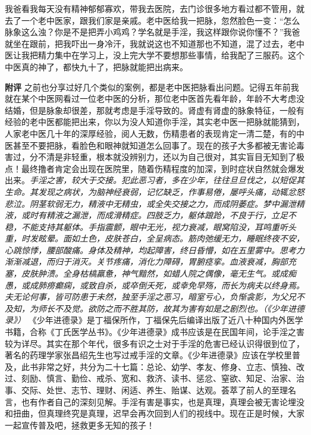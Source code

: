 \begin{case}
    我爸看我每天没有精神郁郁寡欢，带我去医院，去门诊很多地方看过都不管用，就去了一个老中医家，跟我们家是亲戚。老中医给我一把脉，忽然脸色一变：“怎么脉象这么浊？你是不是把弄小鸡鸡？学名就是手淫，我这样跟你说你懂不？”我爸就坐在跟前，把我吓出一身冷汗，我就说这也不知道那也不知道，混了过去，老中医让我把精力集中在学习上，没上完大学不要想那些事情，给我配了三服药。这个中医真的神了，都快九十了，把脉就能把出病来。

    \textbf{附评} 之前也分享过好几个类似的案例，都是老中医把脉看出问题。记得五年前我就在某个中医网看过一位老中医的分析，那位老中医首先看年龄，年龄不大考虑没结婚，但是脉象却很差，那就考虑是手淫导致的。肾虚有肾虚的脉象特征，一般有经验的老中医都能把出来，你以为没人知道你手淫，其实老中医一把脉就能猜到，人家老中医几十年的深厚经验，阅人无数，伤精患者的表现肯定一清二楚，有的中医甚至不要把脉，看脸色和眼神就知道怎么回事了。现在的孩子大多都被无害论毒害过，分不清是非轻重，根本就没辨别力，还以为自己很对，其实盲目无知到了极点！最终撸者肯定会出现在医院里，随着伤精程度的加深，到时症状自然就会爆发出来。\textit{手淫之害，较大于交接。犯此恶习者，多在少年，往往旦旦伐之，以短促其生命。其发现之病状，为脑神经衰弱，记忆缺乏，作事易倦，屡呼头痛，动辄忿怒悲泣。阴茎软弱无力，精液中无精虫，或全失交接之力，而成阴萎症。梦中漏泄精液，或时有精液之漏泄，而成滑精症。四肢乏力，躯体踉跄，不良于行，立足不稳，不能支持其躯体。手指震颤，眼中无光，视力衰减，眼窝陷没，耳鸣重听头重，时发眩晕。面如土色，皮肤苍白，全呈病态。筋肉弛缓无力，睡眠终夜不安，心跳惊悸，腰部酸痛。身体及精神，均起障害，终日昏懵，如在五里雾中。思考力渐渐减退，而归于消灭。关节疼痛，消化力障碍，胃腑痉挛。血液衰减，胸部充塞，皮肤肿溃。全身枯槁羸惫，神气黯然，如蜡人院之偶像，毫无生气。或成痴愚，或成肺痨癫痫，或致自杀，或卒倒夭死，或幸免早殇，而长为病夫以终身焉。夫无论何事，皆可防患于未然，独至手淫之恶习，暗室亏心，负惭衾影，为父兄不及知，为师长不及觉。欲防之而不胜其防，故其为害有如是之剧烈也。（《少年进德录》）} 《少年进德录》是丁福保所作，丁福保先后编译出版了近八十种国内外医学书籍，合称《丁氏医学丛书》。《少年进德录》成书应该是在民国年间，论手淫之害较为详尽。其实在那个年代，很多有识之士对于手淫的危害已经认识得很到位了，著名的药理学家张昌绍先生也写过戒手淫的文章。《少年进德录》应该在学校里普及，此书非常之好，共分为二十七篇：总论、幼学、孝友、修身、立志、慎独、改过、刻励、慎言、勤俭、戒杀、宽和、救济、读书、惩忿、窒欲、知足、治家、治事、交际、处世、志节、理财、闲适、养生、贻谋、达观。荟萃了前人的至理名言，也有作者自己的深刻见解。手淫有害是事实，也是真理，真理会被无害论埋没和扭曲，但真理终究是真理，迟早会再次回到人们的视线中。现在正是时候，大家一起宣传普及吧，拯救更多无知的孩子！
\end{case}

